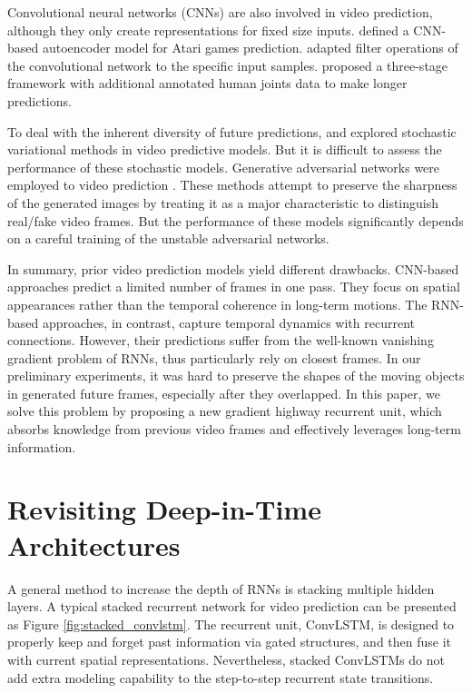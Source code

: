 \documentclass{article}
\begin{document}
Convolutional neural networks (CNNs) are also involved in video prediction, although they only create representations for fixed size inputs.
\citet{Oh2015Action} defined a CNN-based autoencoder model for Atari games prediction.
\citet{de2016dynamic} adapted filter operations of the convolutional network to the specific input samples.
\citet{villegas2017learning} proposed a three-stage framework with additional annotated human joints data to make longer predictions. 


To deal with the inherent diversity of future predictions, \citet{babaeizadeh2017stochastic} and \citet{denton2018stochastic} explored stochastic variational methods in video predictive models. But it is difficult to assess the performance of these stochastic models. Generative adversarial networks \cite{Goodfellow2014Generative,Denton2015Deep} were employed to video prediction \cite{Mathieu2015Deep,vondrick2016generating,bhattacharjee2017temporal,denton2017unsupervised,lu2017flexible,tulyakov2017mocogan}. These methods attempt to preserve the sharpness of the generated images by treating it as a major characteristic to distinguish real/fake video frames. But the performance of these models significantly depends on a careful training of the unstable adversarial networks. 

In summary, prior video prediction models yield different drawbacks. CNN-based approaches predict a limited number of frames in one pass. They focus on spatial appearances rather than the temporal coherence in long-term motions. The RNN-based approaches, in contrast, capture temporal dynamics with recurrent connections. However, their predictions suffer from the well-known vanishing gradient problem of RNNs, thus particularly rely on closest frames. In our preliminary experiments, it was hard to preserve the shapes of the moving objects in generated future frames, especially after they overlapped. In this paper, we solve this problem by proposing a new gradient highway recurrent unit, which absorbs knowledge from previous video frames and effectively leverages long-term information.



\section{Revisiting Deep-in-Time Architectures}





A general method to increase the depth of RNNs is stacking multiple hidden layers. A typical stacked recurrent network for video prediction \cite{shi2015convolutional} can be presented as Figure \ref{fig:stacked_convlstm}. The recurrent unit, ConvLSTM, is designed to properly keep and forget past information via gated structures, and then fuse it with current spatial representations. Nevertheless, stacked ConvLSTMs do not add extra modeling capability to the step-to-step recurrent state transitions.
\end{document}

